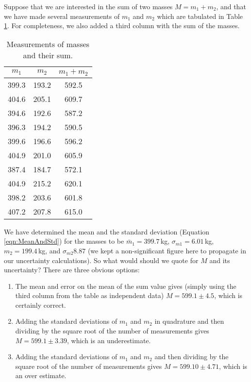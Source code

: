 Suppose that we are interested in the sum of two masses $M=m_1+m_2$, and that we have made several measurements of $m_1$ and $m_2$ which are tabulated in Table \ref{tab:massSum}. For completeness, we also added a third column with the sum of the masses.

\begin{table}[h]
\center
\begin{tabular}{ |c|c|c| }
  \hline
  \textbf{$m_1$} & \textbf{$m_2$} & \textbf{$m_1+m_2$}\\
  \hline
  399.3 & 193.2& 592.5 \\ 
  \hline
  404.6 & 205.1& 609.7 \\ 
  \hline
  394.6 & 192.6& 587.2 \\ 
  \hline
  396.3 & 194.2& 590.5 \\ 
  \hline
  399.6 & 196.6& 596.2 \\ 
  \hline
  404.9 & 201.0& 605.9 \\ 
  \hline
  387.4 & 184.7& 572.1 \\ 
  \hline
  404.9 & 215.2& 620.1 \\ 
  \hline
  398.2 & 203.6& 601.8 \\ 
  \hline
  407.2 & 207.8& 615.0 \\ 
  \hline
\end{tabular}
\caption{\label{tab:massSum}Measurements of masses and their sum.}
\end{table}
We have determined the mean and the standard deviation (Equation \ref{eqn:MeanAndStd}) for the masses to be $\bar m_1 = 399.7$\,kg, $ \sigma_{m1} = 6.01$\,kg, $m_2=199.4$\,kg, and $\sigma_{m2} 8.87$ (we kept a non-significant figure here to propagate in our uncertainty calculations). So what would should we quote for $M$ and its uncertainty? There are three obvious options:
\begin{enumerate}
\item The mean and error on the mean of the sum value gives (simply using the third column from the table as independent data) $M=599.1 \pm 4.5$, which is certainly correct.
\item Adding the standard deviations of $m_1$ and $m_2$ in quadrature and then dividing by the square root of the number of measurements gives $M= 599.1 \pm 3.39$, which is an underestimate.
\item Adding the standard deviations of $m_1$ and $m_2$ and then dividing by the square root of the number of measurements gives $M= 599.10 \pm 4.71$, which is an over estimate.
\end{enumerate}

